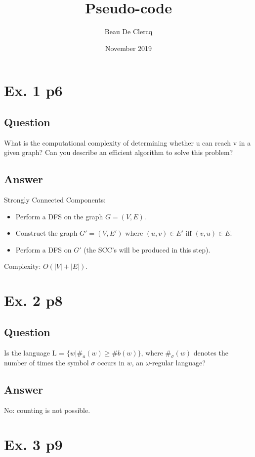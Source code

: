 \documentclass[12pt]{article}
\title{Pseudo-code}
\author{Beau De Clercq}
\date{November 2019}
\begin{document}
\maketitle{}



\section{Ex. 1 p6}
\subsection{Question}
What is the computational complexity of determining whether u can reach v in a given graph? Can you describe an efficient algorithm to solve this problem?

\subsection{Answer}
Strongly Connected Components:
\begin{itemize}
	\item Perform a DFS on the graph $G = (V, E)$.
	\item Construct the graph $G' = (V, E')$ where $(u, v) \in E'$ iff $(v, u) \in E$.
	\item Perform a DFS on $G'$ (the SCC's will be produced in this step).
\end{itemize}
Complexity: $O(|V|+|E|)$.

\newpage
\section{Ex. 2 p8}
\subsection{Question}
Is the language L = $\{w|\#_a(w) \geq \#b(w)\}$, where $\#_\sigma(w)$ denotes the number of times the symbol $\sigma$ occurs in $w$, an $\omega$-regular language?

\subsection{Answer}
No: counting is not possible.


\section{Ex. 3 p9}
\end{document}

